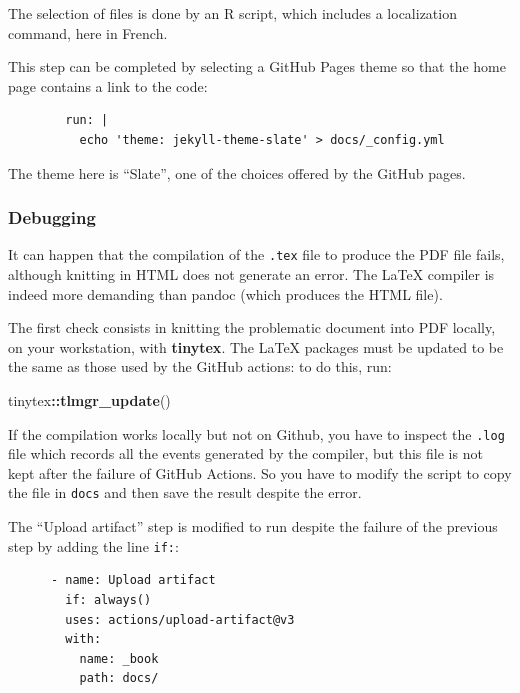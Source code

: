 \documentclass[
  12pt,
  american,
  a4paper,
  extrafontsizes,onecolumn,openright
  ]{memoir}
\newenvironment{Shaded}{\begin{snugshade}}{\end{snugshade}}
\newcommand{\FunctionTok}[1]{\textcolor[rgb]{0.13,0.29,0.53}{\textbf{#1}}}
\newcommand{\NormalTok}[1]{#1}
\newcommand{\SpecialCharTok}[1]{\textcolor[rgb]{0.81,0.36,0.00}{\textbf{#1}}}
\begin{document}
The selection of files is done by an R script, which includes a localization command, here in French.

This step can be completed by selecting a GitHub Pages theme so that the home page contains a link to the code:

\begin{verbatim}
        run: |
          echo 'theme: jekyll-theme-slate' > docs/_config.yml
\end{verbatim}

The theme here is \enquote{Slate}, one of the choices offered by the GitHub pages.

\subsubsection{Debugging}\label{debugging}

It can happen that the compilation of the \texttt{.tex} file to produce the PDF file fails, although knitting in HTML does not generate an error.
The LaTeX compiler is indeed more demanding than pandoc (which produces the HTML file).

The first check consists in knitting the problematic document into PDF locally, on your workstation, with \textbf{tinytex}.
The LaTeX packages must be updated to be the same as those used by the GitHub actions: to do this, run:

\scriptsize

\begin{Shaded}
\begin{Highlighting}[]
\NormalTok{tinytex}\SpecialCharTok{::}\FunctionTok{tlmgr\_update}\NormalTok{()}
\end{Highlighting}
\end{Shaded}

\normalsize

If the compilation works locally but not on Github, you have to inspect the \texttt{.log} file which records all the events generated by the compiler, but this file is not kept after the failure of GitHub Actions.
So you have to modify the script to copy the file in \texttt{docs} and then save the result despite the error.

The \enquote{Upload artifact} step is modified to run despite the failure of the previous step by adding the line \texttt{if:}:

\begin{verbatim}
      - name: Upload artifact
        if: always()
        uses: actions/upload-artifact@v3
        with:
          name: _book
          path: docs/
\end{verbatim}
\end{document}
